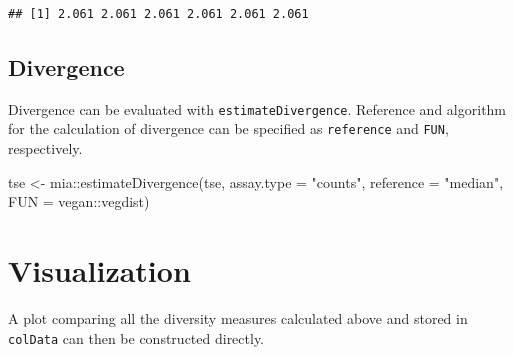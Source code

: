 \documentclass[
]{book}
\newenvironment{Shaded}{\begin{snugshade}}{\end{snugshade}}
\newcommand{\AttributeTok}[1]{\textcolor[rgb]{0.77,0.63,0.00}{#1}}
\newcommand{\FunctionTok}[1]{\textcolor[rgb]{0.00,0.00,0.00}{#1}}
\newcommand{\NormalTok}[1]{#1}
\newcommand{\OtherTok}[1]{\textcolor[rgb]{0.56,0.35,0.01}{#1}}
\newcommand{\SpecialCharTok}[1]{\textcolor[rgb]{0.00,0.00,0.00}{#1}}
\newcommand{\StringTok}[1]{\textcolor[rgb]{0.31,0.60,0.02}{#1}}
\begin{document}
\begin{verbatim}
## [1] 2.061 2.061 2.061 2.061 2.061 2.061
\end{verbatim}

\hypertarget{divergence}{%
\subsection{Divergence}\label{divergence}}

Divergence can be evaluated with \texttt{estimateDivergence}. Reference and algorithm for the calculation of divergence can be specified as \texttt{reference} and \texttt{FUN}, respectively.

\begin{Shaded}
\begin{Highlighting}[]
\NormalTok{tse }\OtherTok{\textless{}{-}}\NormalTok{ mia}\SpecialCharTok{::}\FunctionTok{estimateDivergence}\NormalTok{(tse,}
                               \AttributeTok{assay.type =} \StringTok{"counts"}\NormalTok{,}
                               \AttributeTok{reference =} \StringTok{"median"}\NormalTok{,}
                               \AttributeTok{FUN =}\NormalTok{ vegan}\SpecialCharTok{::}\NormalTok{vegdist)}
\end{Highlighting}
\end{Shaded}

\hypertarget{visualization}{%
\section{Visualization}\label{visualization}}

A plot comparing all the diversity measures calculated above and stored in \texttt{colData} can then be constructed directly.
\end{document}
